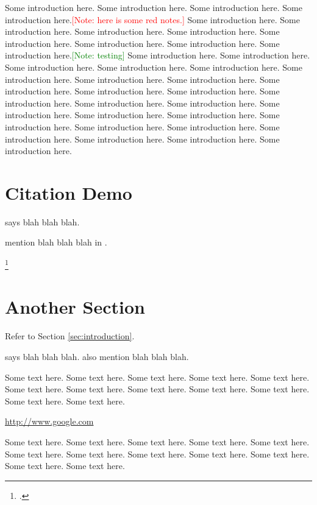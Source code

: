 \documentclass[11pt,twoside]{article}
\newcommand*{\citefoot}{\footcite}
\newcommand*{\citefull}{\fullcite}
\newcommand*{\citeno}{\nocite}
\theoremstyle{plain}
\theoremstyle{definition}
\theoremstyle{remark}
\newcommand{\green}[1]{\textcolor{green}{[Note: #1]}}
\newcommand{\red}[1]{\textcolor{red}{[Note: #1]}}
\begin{document}
Some introduction here. Some introduction here. Some introduction here. Some introduction here.\red{here is some red notes.}
Some introduction here. Some introduction here. Some introduction here. Some introduction here.
Some introduction here. Some introduction here. Some introduction here. Some introduction here.\green{testing}
Some introduction here. Some introduction here. Some introduction here. Some introduction here.
Some introduction here. Some introduction here. Some introduction here. Some introduction here.
Some introduction here. Some introduction here. Some introduction here. Some introduction here.
Some introduction here. Some introduction here. Some introduction here. Some introduction here.
Some introduction here. Some introduction here. Some introduction here. Some introduction here.
Some introduction here. Some introduction here. Some introduction here. Some introduction here.


\section{Citation Demo}
\label{sec:Citation Demo}

\citet{Smith2008} says blah blah blah.

\citeauthor{Smith2008} mention blah blah blah in \citeyear{Smith2008}.

\citep{Smith2008}

\citefull{Smith2008}

\citefoot{Smith2008}

\citeno{Smith2008}

\cite{Smith2008}


\section{Another Section} %
\label{sec:another_section}

Refer to Section \ref{sec:introduction}.

\citet{Smith2008} says blah blah blah. \citeauthor{Smith2008} also mention blah blah blah.

Some text here. Some text here. Some text here. Some text here.
Some text here. Some text here. Some text here. Some text here.
Some text here. Some text here. Some text here. Some text here.

\url{http://www.google.com}

Some text here. Some text here. Some text here. Some text here.
Some text here. Some text here. Some text here. Some text here.
Some text here. Some text here. Some text here. Some text here.
\end{document}

